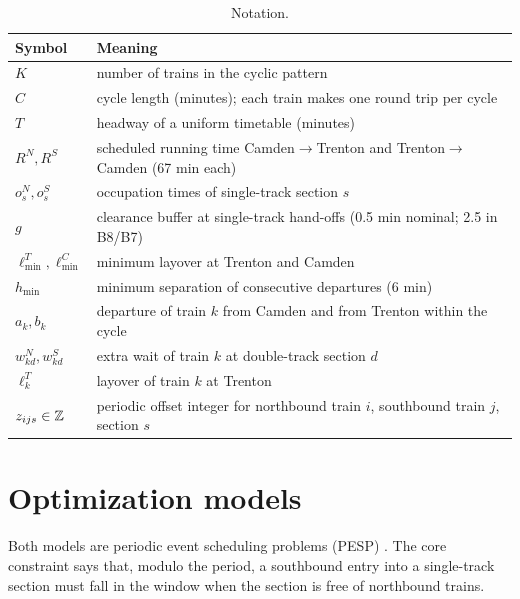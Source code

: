 \documentclass[11pt]{article}
\begin{document}
\begin{table}[ht]\centering\small
\begin{tabularx}{\textwidth}{@{}lL@{}}
\toprule
Symbol & Meaning \\ \midrule
$K$ & number of trains in the cyclic pattern \\
$C$ & cycle length (minutes); each train makes one round trip per cycle \\
$T$ & headway of a uniform timetable (minutes) \\
$R^N, R^S$ & scheduled running time Camden$\to$Trenton and Trenton$\to$Camden (67 min each) \\
$o^N_s, o^S_s$ & occupation times of single-track section $s$ \\
$g$ & clearance buffer at single-track hand-offs (0.5 min nominal; 2.5 in B8/B7) \\
$\ell_{\min}^T,\ell_{\min}^C$ & minimum layover at Trenton and Camden \\
$h_{\min}$ & minimum separation of consecutive departures (6 min) \\
$a_k, b_k$ & departure of train $k$ from Camden and from Trenton within the cycle \\
$w^N_{kd}, w^S_{kd}$ & extra wait of train $k$ at double-track section $d$ \\
$\ell^T_k$ & layover of train $k$ at Trenton \\
$z_{ijs}\in\mathbb{Z}$ & periodic offset integer for northbound train $i$, southbound train $j$, section $s$ \\
\bottomrule
\end{tabularx}
\caption{Notation.}\label{tab:notation}
\end{table}

\section{Optimization models}\label{sec:mips}
Both models are periodic event scheduling problems (PESP) \citep{serafini1989mathematical,liebchen2008first}. The core constraint says that, modulo the period, a southbound entry into a single-track section must fall in the window when the section is free of northbound trains.
\end{document}

